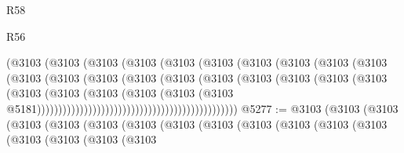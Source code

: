 \begin{lexlean}{R58}
\begin{lexlean}{R56}
\begin{coremodule}
{{{{{{{{{{{{{{{{{{{{{{{{{{{{{{{{{{{{{{{{{{{{{{{{{{{{{{{{{{{{{{{{{{{{{{{{{{{{{{{{{{{{{{{{{{{{{{{{{{{{{{{{{{{{{{{{{{{{{{{{{{{{{{{{{{{{{{{{{{{{{{{{{{{{{{{{{{{{{{{{{{{{{{{{{{{{{{{{{{{{{{{{{{{{{{{{{{{{{{{{{{{{{{{{{{{                                              (@3103
                                                (@3103
                                                  (@3103
                                                    (@3103
                                                      (@3103
                                                        (@3103
                                                          (@3103
                                                            (@3103
                                                              (@3103
                                                                (@3103
                                                                  (@3103
                                                                    (@3103
                                                                      (@3103
                                                                        (@3103
                                                                          (@3103
                                                                            (@3103
                                                                              (@3103
                                                                                (@3103
                                                                                  (@3103
                                                                                    (@3103
                                                                                      (@3103
                                                                                        (@3103
                                                                                          (@3103
                                                                                            (@3103
                                                                                              (@3103
                                                                                                (@3103
                                                                                                  @5181)))))))))))))))))))))))))))))))))))))))))))))))
@5277 := @3103
    (@3103
      (@3103
        (@3103
          (@3103
            (@3103
              (@3103
                (@3103
                  (@3103
                    (@3103
                      (@3103
                        (@3103
                          (@3103
                            (@3103
                              (@3103
                                (@3103
                                  (@3103
}}}}}}}}}}}}}}}}}}}}}}}}}}}}}}}}}}}}}}}}}}}}}}}}}}}}}}}}}}}}}}}}}}}}}}}}}}}}}}}}}}}}}}}}}}}}}}}}}}}}}}}}}}}}}}}}}}}}}}}}}}}}}}}}}}}}}}}}}}}}}}}}}}}}}}}}}}}}}}}}}}}}}}}}}}}}}}}}}}}}}}}}}}}}}}}}}}}}}}}}}}}}}}}}}}}
\end{coremodule}
\end{lexlean}
\end{lexlean}
